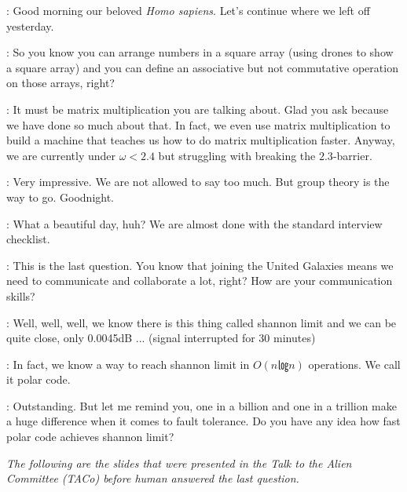 \documentclass[12pt, aspectratio=1610]{beamer}
\begin{document}
\begin{frame}
	\Alien:
	Good morning our beloved \emph{Homo sapiens}.
	Let's continue where we left off yesterday.
	
	\pause

	\Alien:
	So you know you can arrange numbers in a square array
	(using drones to show a square array)
	and you can define an associative but not commutative operation
	on those arrays, right?

	\pause

	\Human:
	It must be matrix multiplication you are talking about.
	Glad you ask because we have done so much about that.
	In fact, we even use matrix multiplication to build a machine
	that teaches us how to do matrix multiplication faster.
	Anyway, we are currently under $ω < 2.4$
	but struggling with breaking the $2.3$-barrier.

	\pause

	\Alien:
	Very impressive.
	We are not allowed to say too much.
	But group theory is the way to go.
	Goodnight.
\end{frame}

\begin{frame}
	\Alien:
	What a beautiful day, huh?
	We are almost done with the standard interview checklist.

	\pause

	\Alien:
	This is the last question.
	You know that joining the United Galaxies means we need to
	communicate and collaborate a lot, right?
	How are your communication skills?

	\pause

	\Human:
	Well, well, well, we know there is this thing called shannon limit
	and we can be quite close, only 0.0045dB ...
	(signal interrupted for 30 minutes)

	\pause

	\Human:
	In fact, we know a way to reach shannon limit in $O(n㏒n)$ operations.
	We call it polar code.
\end{frame}

\begin{frame}
	\Alien:
	Outstanding.
	But let me remind you, one in a billion and one in a trillion
	make a huge difference when it comes to fault tolerance.
	Do you have any idea how fast polar code achieves shannon limit?

	\pause

	\itshape
	The following are the slides that were presented
	in the \textup{Talk to the Alien Committee (TACo)}
	before human answered the last question.
\end{frame}
\end{document}
